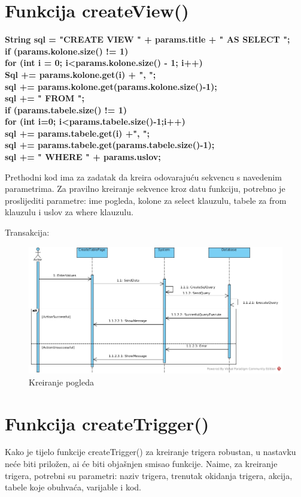 \documentclass[12pt, a4paper]{report}
\theoremstyle{definition}
\begin{document}
\section{Funkcija createView()}


\textbf{String sql = "CREATE VIEW " + params.title +  " AS SELECT ";\\
if (params.kolone.size() != 1)\\
for (int i = 0; i<params.kolone.size() - 1; i++)\\
Sql += params.kolone.get(i) + ", ";\\
sql += params.kolone.get(params.kolone.size()-1);\\
sql += " FROM ";\\
if (params.tabele.size() != 1)\\
for (int i=0; i<params.tabele.size()-1;i++) \\
sql += params.tabele.get(i) +", ";\\
sql += params.tabele.get(params.tabele.size()-1);\\
sql += " WHERE " + params.uslov;\\}

Prethodni kod ima za zadatak da kreira odovarajuću sekvencu s navedenim parametrima. Za pravilno kreiranje sekvence kroz datu funkciju, potrebno je proslijediti parametre: ime pogleda, kolone za select klauzulu, tabele za from klauzulu i uslov za where klauzulu.

Transakcija:
\begin{figure}[H]
	\begin{center} 
		\includegraphics[height=0.5\textwidth]{CreateView.jpg}
	\end{center}
	\caption{Kreiranje pogleda}
\end{figure}

\section{Funkcija createTrigger()}
Kako je tijelo funkcije createTrigger() za kreiranje trigera robustan, u nastavku neće biti priložen, ai će biti objašnjen smisao funkcije. Naime, za kreiranje trigera, potrebni su parametri: naziv trigera, trenutak okidanja trigera, akcija, tabele koje obuhvaća, varijable i kod. 
\end{document}
